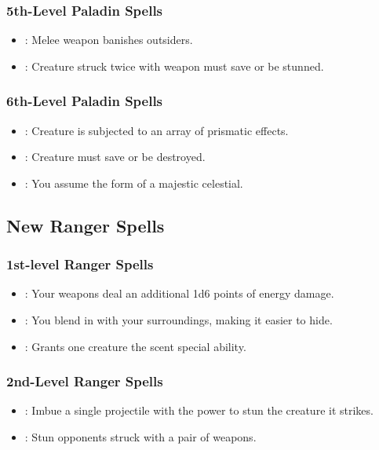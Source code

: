 \subsubsection{5th-Level Paladin Spells}
\begin{itemize}
 \item {}: Melee weapon banishes outsiders.
 \item {}: Creature struck twice with weapon must save or be stunned.
\end{itemize}
\subsubsection{6th-Level Paladin Spells}
\begin{itemize}
 \item {}: Creature is subjected to an array of prismatic effects.
 \item {}: Creature must save or be destroyed.
 \item {}: You assume the form of a majestic celestial.
\end{itemize}


\subsection{New Ranger Spells}
\subsubsection{1st-level Ranger Spells}
\begin{itemize}
 \item {}: Your weapons deal an additional 1d6 points of energy damage.
 \item {}: You blend in with your surroundings, making it easier to hide.
 \item {}: Grants one creature the scent special ability.
\end{itemize}
\subsubsection{2nd-Level Ranger Spells}
\begin{itemize}
 \item {}: Imbue a single projectile with the power to stun the creature it strikes.
 \item {}: Stun opponents struck with a pair of weapons.
\end{itemize}
